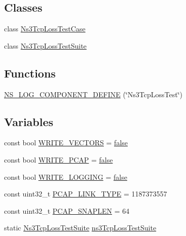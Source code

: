 \subsection*{Classes}
\begin{DoxyCompactItemize}
\item 
class \hyperlink{classNs3TcpLossTestCase}{Ns3\+Tcp\+Loss\+Test\+Case}
\item 
class \hyperlink{classNs3TcpLossTestSuite}{Ns3\+Tcp\+Loss\+Test\+Suite}
\end{DoxyCompactItemize}
\subsection*{Functions}
\begin{DoxyCompactItemize}
\item 
\hyperlink{ns3tcp-loss-test-suite_8cc_a78c1d61c921fa35876cd1f41bbd4a5fa}{N\+S\+\_\+\+L\+O\+G\+\_\+\+C\+O\+M\+P\+O\+N\+E\+N\+T\+\_\+\+D\+E\+F\+I\+NE} (\char`\"{}Ns3\+Tcp\+Loss\+Test\char`\"{})
\end{DoxyCompactItemize}
\subsection*{Variables}
\begin{DoxyCompactItemize}
\item 
const bool \hyperlink{ns3tcp-loss-test-suite_8cc_a6829179e1fbdbc03f407d65a63c07153}{W\+R\+I\+T\+E\+\_\+\+V\+E\+C\+T\+O\+RS} = \hyperlink{lte__cqi__generation_8m_ab1bef239d413c4da139c4bac92cd657a}{false}
\item 
const bool \hyperlink{ns3tcp-loss-test-suite_8cc_a9ba71edaadfde927e9912e6b37a37f39}{W\+R\+I\+T\+E\+\_\+\+P\+C\+AP} = \hyperlink{lte__cqi__generation_8m_ab1bef239d413c4da139c4bac92cd657a}{false}
\item 
const bool \hyperlink{ns3tcp-loss-test-suite_8cc_ad6baebe9f475ef91ab29a12e30e30e7b}{W\+R\+I\+T\+E\+\_\+\+L\+O\+G\+G\+I\+NG} = \hyperlink{lte__cqi__generation_8m_ab1bef239d413c4da139c4bac92cd657a}{false}
\item 
const uint32\+\_\+t \hyperlink{ns3tcp-loss-test-suite_8cc_a1d33ea10cde9143eb9b36be021f3739e}{P\+C\+A\+P\+\_\+\+L\+I\+N\+K\+\_\+\+T\+Y\+PE} = 1187373557
\item 
const uint32\+\_\+t \hyperlink{ns3tcp-loss-test-suite_8cc_ae9a6b49b98d0c7917dda456f6771d2e1}{P\+C\+A\+P\+\_\+\+S\+N\+A\+P\+L\+EN} = 64
\item 
static \hyperlink{classNs3TcpLossTestSuite}{Ns3\+Tcp\+Loss\+Test\+Suite} \hyperlink{ns3tcp-loss-test-suite_8cc_a2ec5e7588554ea151e36abf46a3a5de4}{ns3\+Tcp\+Loss\+Test\+Suite}
\end{DoxyCompactItemize}


